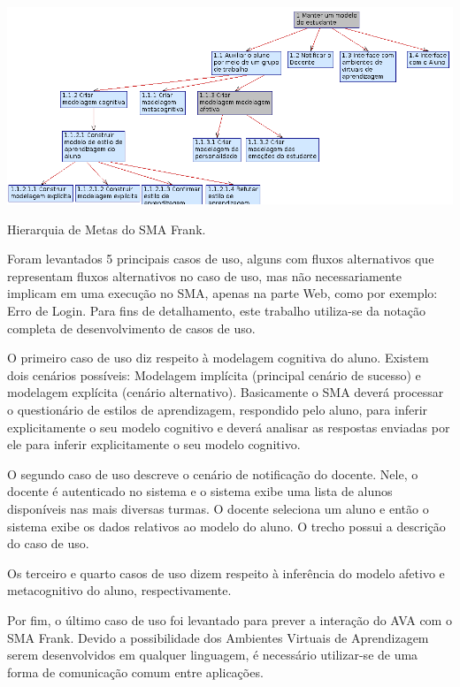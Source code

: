 \begin{table}
	\centering
	\includegraphics[scale=0.8]{images/metas-frank.png}
	\caption{Hierarquia de Metas do SMA Frank.}
	\label{fig:metas-frank}
\end{table}

Foram levantados 5 principais casos de uso, alguns com fluxos alternativos que representam fluxos alternativos no caso de uso, mas não necessariamente implicam em uma execução no SMA, apenas na parte Web, como por exemplo: Erro de Login. Para fins de detalhamento, este trabalho utiliza-se da notação completa de desenvolvimento de casos de uso.

O primeiro caso de uso diz respeito à modelagem cognitiva do aluno. Existem dois cenários possíveis: Modelagem implícita (principal cenário de sucesso) e modelagem explícita (cenário alternativo). Basicamente o SMA deverá processar o questionário de estilos de aprendizagem, respondido pelo aluno, para inferir explicitamente o seu modelo cognitivo e deverá analisar as respostas enviadas por ele para inferir explicitamente o seu modelo cognitivo.



O segundo caso de uso descreve o cenário de notificação do docente. Nele, o docente é autenticado no sistema e o sistema exibe uma lista de alunos disponíveis nas mais diversas turmas. O docente seleciona um aluno e então o sistema exibe os dados relativos ao modelo do aluno. O trecho possui a descrição do caso de uso.



Os terceiro e quarto casos de uso dizem respeito à inferência do modelo afetivo e metacognitivo do aluno, respectivamente.





Por fim, o último caso de uso foi levantado para prever a interação do AVA com o SMA Frank. Devido a possibilidade dos Ambientes Virtuais de Aprendizagem serem desenvolvidos em qualquer linguagem, é necessário utilizar-se de uma forma de comunicação comum entre aplicações.

